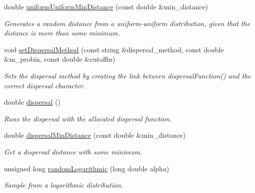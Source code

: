 \begin{DoxyCompactItemize}
double \hyperlink{class_n_rrand_a31cfb60ce2a776bb81479b80f585202f}{uniform\+Uniform\+Min\+Distance} (const double \&min\+\_\+distance)
\begin{DoxyCompactList}\small\item\em Generates a random distance from a uniform-\/uniform distribution, given that the distance is more than some minimum. \end{DoxyCompactList}\item 
void \hyperlink{class_n_rrand_a432b648073ccd3cb7f8215bb5c299619}{set\+Dispersal\+Method} (const string \&dispersal\+\_\+method, const double \&m\+\_\+probin, const double \&cutoffin)
\begin{DoxyCompactList}\small\item\em Sets the dispersal method by creating the link between dispersal\+Function() and the correct dispersal character. \end{DoxyCompactList}\item 
double \hyperlink{class_n_rrand_a1e15746ff8398488245b750325f37b08}{dispersal} ()
\begin{DoxyCompactList}\small\item\em Runs the dispersal with the allocated dispersal function. \end{DoxyCompactList}\item 
double \hyperlink{class_n_rrand_a3cb0629d54b54865403738edd84ba883}{dispersal\+Min\+Distance} (const double \&min\+\_\+distance)
\begin{DoxyCompactList}\small\item\em Get a dispersal distance with some minimum. \end{DoxyCompactList}\item 
unsigned long \hyperlink{class_n_rrand_a347f480f78917ebcc822f0f3b74825c3}{random\+Logarithmic} (long double alpha)
\begin{DoxyCompactList}\small\item\em Sample from a logarithmic distribution. \end{DoxyCompactList}\end{DoxyCompactItemize}
